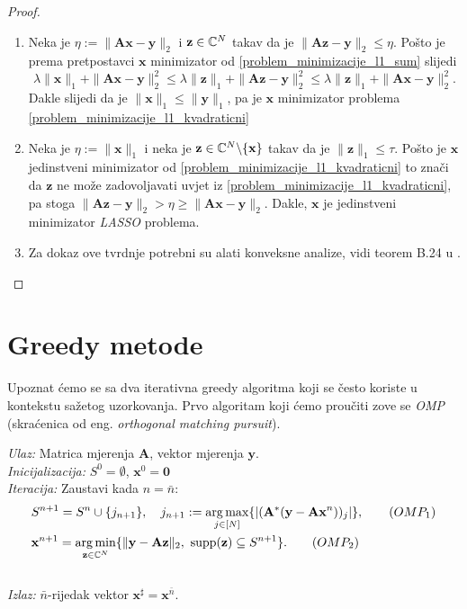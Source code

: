 \documentclass[a4paper,twoside,12pt]{memoir} %
\newcommand{\vect}[1]{\mathbf{#1}}
\renewcommand{\vec}{\vect}
\newcommand{\supp}{\text{\normalfont{supp}}}
\newcommand{\norm}[1]{\|{#1}\|}
\DeclareMathOperator*{\argmax}{arg\,max}
\DeclareMathOperator*{\argmin}{arg\,min}
\newenvironment{alg}[1]
{
    \bigskip
    \begin{tcolorbox}[arc=0mm,boxrule=1.2pt,colframe=black,colback=white,detach title, before upper={\medskip\begin{center}\textbf{#1}\end{center}\hline\newline\medskip},frame hidden]
    \medskip
}
{
    \medskip
\end{tcolorbox}
    \bigskip
}
\begin{document}
\begin{proof}
    \begin{enumerate}[label=(\alph*)]
        \item Neka je $\eta := \norm{\vec{Ax}- \vec y}_2$ i $\vec z \in \C^N$ takav da je $\norm{\vec{Az-y}}_2 \leq \eta$. Po\v{s}to je prema pretpostavci $\vec x$ minimizator od \eqref{problem_minimizacije_l1_sum} slijedi
            \begin{equation*}
                \lambda \norm{\vec x}_1 + \norm{\vec{Ax} -\vec{y}}_2^2 \leq \lambda \norm{\vec z}_1 + \norm{\vec{Az} - \vec{y}}_2^2 \leq \lambda \norm{\vec z}_1 + \norm{\vec{Ax}-\vec y}_2^2.
            \end{equation*}
            Dakle slijedi da je $\norm{\vec x}_1 \leq \norm{\vec{y}}_1$, pa je $\vec x$ minimizator problema \eqref{problem_minimizacije_l1_kvadraticni}

        \item Neka je $\eta := \norm{\vec x}_1$ i neka je $\vec z \in \C^N\backslash\{\vec x\}$ takav da je $\norm{\vec z}_1 \leq \tau$. Po\v{s}to je $\vec x$ jedinstveni minimizator od \eqref{problem_minimizacije_l1_kvadraticni} to zna\v{c}i da $\vec z$ ne mo\v{z}e zadovoljavati uvjet iz \eqref{problem_minimizacije_l1_kvadraticni}, pa stoga $\norm{\vec{Az}- \vec{y}}_2 > \eta \geq \norm{\vec{Ax}-\vec y}_2$. Dakle, $\vec x$ je jedinstveni minimizator \textit{LASSO} problema.
        \item Za dokaz ove tvrdnje potrebni su alati konveksne analize, vidi teorem B.24 u \cite{foucart13}.
    \end{enumerate}
\end{proof}

\section[Greedy metode][Greedy metode]{Greedy metode}
Upoznat \'cemo se sa dva iterativna greedy algoritma koji se \v{c}esto koriste u kontekstu sa\v{z}etog uzorkovanja. Prvo algoritam koji \'cemo prou\v{c}iti zove se \textit{OMP} (skra\'cenica od eng. \textit{orthogonal matching pursuit}).
\begin{alg}{OMP}
    \textit{Ulaz:} Matrica mjerenja $\vec A$, vektor mjerenja $\vec y$. \\
    \textit{Inicijalizacija:} $S^0 = \emptyset$, $\vec x^0 = \vec 0$ \\
    \textit{Iteracija:} Zaustavi kada $n = \bar{n}$:
        \begin{align}
            &S^{n+1} = S^n \cup \{j_{n+1}\},\quad j_{n+1} := \argmax\limits_{j \in [N]}\{|(\vec A^*(\vec y - \vec{Ax}^n))_j|\},\tag{$OMP_1$}\label{omp_1}
        \\
            &\vec x^{n+1} = \argmin\limits_{\vec z \in \C^N}\{\norm{\vec y - \vec{Az}}_2,\ \supp(\vec z) \subseteq S^{n+1}\}.\tag{$OMP_2$}\label{omp_2}
        \end{align} \\
        \textit{Izlaz:} $\bar{n}$-rijedak vektor $\vec x^{\sharp}=\vec{x}^{\bar{n}}$.
\end{alg}
\end{document}
